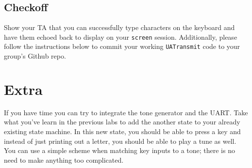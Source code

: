 \documentclass[11pt]{article}
\begin{document}
\subsection{Checkoff}
Show your TA that you can successfully type characters on the keyboard and have them echoed back to display on your \verb|screen| session. Additionally, please follow the instructions below to commit your working \verb|UATransmit| code to your group's Github repo.

\section{Extra}
If you have time you can try to integrate the tone generator and the UART. Take what you've learn in the previous labs to add the another state to your already existing state machine. In this new state, you should be able to press a key and instead of just printing out a letter, you should be able to play a tune as well. You can use a simple scheme when matching key inputs to a tone; there is no need to make anything too complicated. 
\end{document}
